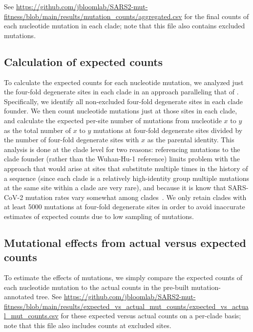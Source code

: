 \documentclass[9pt,twocolumn,twoside]{gsajnl_modified}
\begin{document}
{See \url{https://github.com/jbloomlab/SARS2-mut-fitness/blob/main/results/mutation_counts/aggregated.csv} for the final counts of each nucleotide mutation in each clade; note that this file also contains excluded mutations.

\subsection{Calculation of expected counts}
To calculate the expected counts for each nucleotide mutation, we analyzed just the four-fold degenerate sites in each clade in an approach paralleling that of \cite{bloom2023evolution}.
Specifically, we identify all non-excluded four-fold degenerate sites in each clade founder.
We then count nucleotide mutations just at those sites in each clade, and calculate the expected per-site number of mutations from nucleotide $x$ to $y$ as the total number of $x$ to $y$ mutations at four-fold degenerate sites divided by the number of four-fold degenerate sites with $x$ as the parental identity.
This analysis is done at the clade level for two reasons: referencing mutations to the clade founder (rather than the Wuhan-Hu-1 reference) limits problem with the approach that would arise at sites that substitute multiple times in the history of a sequence (since each clade is a relatively high-identity group multiple mutations at the same site within a clade are very rare), and because it is know that SARS-CoV-2 mutation rates vary somewhat among clades~\citep{bloom2023evolution,ruis2022mutational}.
We only retain clades with at least 5000 mutations at four-fold degenerate sites in order to avoid inaccurate estimates of expected counts due to low sampling of mutations.

\subsection{Mutational effects from actual versus expected counts}
To estimate the effects of mutations, we simply compare the expected counts of each nucleotide mutation to the actual counts in the pre-built mutation-annotated tree.
See \url{https://github.com/jbloomlab/SARS2-mut-fitness/blob/main/results/expected_vs_actual_mut_counts/expected_vs_actual_mut_counts.csv} for these expected versus actual counts on a per-clade basis; note that this file also includes counts at excluded sites.

}
\end{document}

